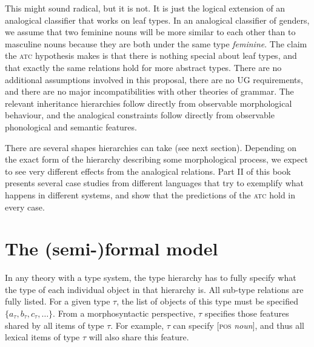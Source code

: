 This might sound radical, but it is not. It is just the logical extension of an analogical classifier that works on leaf types. In an analogical classifier of genders, we assume that two feminine nouns will be more similar to each other than to masculine nouns because they are both under the same type \textit{feminine}. The claim the \textsc{atc} hypothesis makes is that there is nothing special about leaf types, and that exactly the same relations hold for more abstract types. There are no additional assumptions involved in this proposal, there are no UG requirements, and there are no major incompatibilities with other theories of grammar. The relevant inheritance hierarchies follow directly from observable morphological behaviour, and the analogical constraints follow directly from observable phonological and semantic features.

There are several shapes hierarchies can take (see next section). Depending on the exact form of the hierarchy describing some morphological process, we expect to see very different effects from the analogical relations. Part II of this book presents several case studies from different languages that try to exemplify what happens in different systems, and show that the predictions of the \textsc{atc} hold in every case.

\section{The (semi-)formal model}

In any theory with a type system, the type hierarchy has to fully specify what the type of each individual object in that hierarchy is. All sub-type relations are fully listed. For a given type $\tau$, the list of objects of this type must be specified $\{a_{\tau}, b_{\tau}, c_{\tau}, \dots \}$. From a morphosyntactic perspective, $\tau$ specifies those features shared by all items of type $\tau$. For example, $\tau$ can specify [\textsc{pos} \textit{noun}], and thus all lexical items of type $\tau$ will also share this feature.

